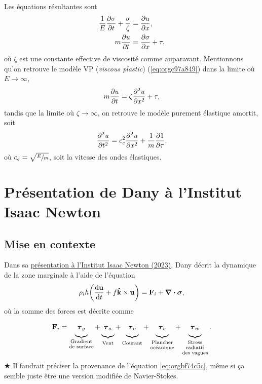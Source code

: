 \documentclass[10pt]{article}
\numberwithin{equation}{section}
\newcommand{\kvf}{\vb{\hat{k}}}
\newcommand{\uu}{\vb{u}}
\newcommand{\short}{\vphantom{pA}}
\newcommand{\tall}{\vphantom{pA^{x^x}_p}}
\newcommand{\grande}{\vphantom{\frac{1}{xx}}}
\begin{document}
Les équations résultantes sont
\begin{align}
   \frac{1}{E}\pdv{\sigma}{t} + \frac{\sigma}{\zeta} &= \pdv{u}{x}, \\
   m\pdv{u}{t} &= \pdv{\sigma}{x} + \tau,
\end{align}
où \(\zeta\) est une constante effective de viscosité comme auparavant.
Mentionnons qu'on retrouve le modèle VP (\emph{viscous plastic}) (\ref{eq:orgc97a849}) dans la limite où \(E\rightarrow\infty\),
\begin{equation}
   m\pdv{u}{t} = \zeta\pdv[2]{u}{x} + \tau,
\end{equation}
tandis que la limite où \(\zeta\rightarrow\infty\), on retrouve le modèle purement élastique amortit, soit
\begin{equation}
   \pdv[2]{u}{t} = c_e^2\pdv[2]{u}{x} + \frac{1}{m}\pdv{1}{\tau},
\end{equation}
où \(c_e = \sqrt{\sfrac{E}{m}}\), soit la vitesse des ondes élastiques. 

\section{Présentation de Dany à l'Institut Isaac Newton}
\label{sec:org397290d}

\subsection{Mise en contexte}
\label{sec:org3030afb}

Dans sa \href{https://www.youtube.com/watch?v=\_V7ozTp6SJM}{présentation à l'Institut Isaac Newton (2023)}, Dany décrit la dynamique de la zone marginale à l'aide de l'équation
\begin{equation}
\label{eq:orgbf74c5c}
   \rho_i h \qty(\dv{\uu}{t} + f \kvf\times\uu) = \vb{F}_i + \divergence{\boldsymbol{\sigma}},
\end{equation}
où la somme des forces est décrite comme
\begin{equation}
\label{eq:org58f9240}
   \vb{F}_i =
    \underbrace{\grande\boldsymbol{\tau}_g}_{\substack{\text{Gradient}\short\\\text{de surface}}}
   +\underbrace{\grande\boldsymbol{\tau}_a}_{\tall\text{Vent}}
   +\underbrace{\grande\boldsymbol{\tau}_o}_{\tall\text{Courant}}
   +\underbrace{\grande\boldsymbol{\tau}_b}_{\substack{\text{Plancher}\vphantom{A^2p}\\\text{océanique}}}
   +\underbrace{\grande\boldsymbol{\tau}_w}_{\substack{\text{Stress}\short\vphantom{A^1}\\\text{radiatif}\short\\\text{des vagues}}} .
\end{equation}
\(\bigstar\) Il faudrait préciser la provenance de l'équation \ref{eq:orgbf74c5c}, même si ça semble juste être une version modifiée de Navier-Stokes.\bigskip
\end{document}
